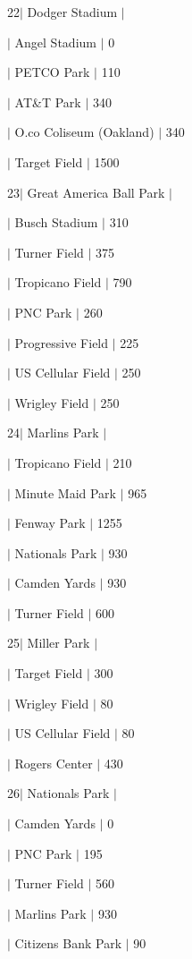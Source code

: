 22$\vert$ Dodger Stadium $\vert$
\begin{DoxyItemize}
\item $\vert$ Angel Stadium $\vert$ 0
\item $\vert$ P\+E\+T\+CO Park $\vert$ 110
\item $\vert$ AT\&T Park $\vert$ 340
\item $\vert$ O.\+co Coliseum (Oakland) $\vert$ 340
\item $\vert$ Target Field $\vert$ 1500
\end{DoxyItemize}

23$\vert$ Great America Ball Park $\vert$
\begin{DoxyItemize}
\item $\vert$ Busch Stadium $\vert$ 310
\item $\vert$ Turner Field $\vert$ 375
\item $\vert$ Tropicano Field $\vert$ 790
\item $\vert$ P\+NC Park $\vert$ 260
\item $\vert$ Progressive Field $\vert$ 225
\item $\vert$ US Cellular Field $\vert$ 250
\item $\vert$ Wrigley Field $\vert$ 250
\end{DoxyItemize}

24$\vert$ Marlins Park $\vert$
\begin{DoxyItemize}
\item $\vert$ Tropicano Field $\vert$ 210
\item $\vert$ Minute Maid Park $\vert$ 965
\item $\vert$ Fenway Park $\vert$ 1255
\item $\vert$ Nationals Park $\vert$ 930
\item $\vert$ Camden Yards $\vert$ 930
\item $\vert$ Turner Field $\vert$ 600
\end{DoxyItemize}

25$\vert$ Miller Park $\vert$
\begin{DoxyItemize}
\item $\vert$ Target Field $\vert$ 300
\item $\vert$ Wrigley Field $\vert$ 80
\item $\vert$ US Cellular Field $\vert$ 80
\item $\vert$ Rogers Center $\vert$ 430
\end{DoxyItemize}

26$\vert$ Nationals Park $\vert$
\begin{DoxyItemize}
\item $\vert$ Camden Yards $\vert$ 0
\item $\vert$ P\+NC Park $\vert$ 195
\item $\vert$ Turner Field $\vert$ 560
\item $\vert$ Marlins Park $\vert$ 930
\item $\vert$ Citizens Bank Park $\vert$ 90
\end{DoxyItemize}

